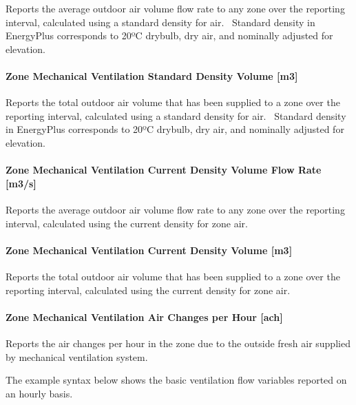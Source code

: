 Reports the average outdoor air volume flow rate to any zone over the reporting interval, calculated using a standard density for air.~ Standard density in EnergyPlus corresponds to 20ºC drybulb, dry air, and nominally adjusted for elevation.

\paragraph{Zone Mechanical Ventilation Standard Density Volume {[}m3{]}}\label{zone-mechanical-ventilation-standard-density-volume-m3}

Reports the total outdoor air volume that has been supplied to a zone over the reporting interval, calculated using a standard density for air.~ Standard density in EnergyPlus corresponds to 20ºC drybulb, dry air, and nominally adjusted for elevation.

\paragraph{Zone Mechanical Ventilation Current Density Volume Flow Rate {[}m3/s{]}}\label{zone-mechanical-ventilation-current-density-volume-flow-rate-m3s}

Reports the average outdoor air volume flow rate to any zone over the reporting interval, calculated using the current density for zone air.

\paragraph{Zone Mechanical Ventilation Current Density Volume {[}m3{]}}\label{zone-mechanical-ventilation-current-density-volume-m3}

Reports the total outdoor air volume that has been supplied to a zone over the reporting interval, calculated using the current density for zone air.

\paragraph{Zone Mechanical Ventilation Air Changes per Hour {[}ach{]}}\label{zone-mechanical-ventilation-air-changes-per-hour-ach}

Reports the air changes per hour in the zone due to the outside fresh air supplied by mechanical ventilation system.

The example syntax below shows the basic ventilation flow variables reported on an hourly basis.

